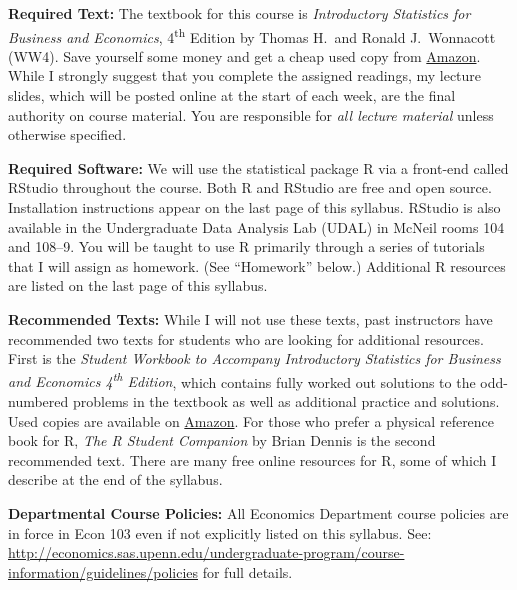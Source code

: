 \documentclass[11pt, letterpaper]{article}
\begin{document}
\medskip

\noindent \textbf{Required Text:} 
The textbook for this course is \emph{Introductory Statistics for Business and Economics}, 4\textsuperscript{th} Edition by Thomas H.\ and Ronald J.\ Wonnacott (WW4). 
Save yourself some money and get a cheap used copy from \href{http://tinyurl.com/ECON103-2013A}{Amazon}.
While I strongly suggest that you complete the assigned readings, my lecture slides, which will be posted online at the start of each week, are the final authority on course material. 
You are responsible for \emph{all lecture material} unless otherwise specified.

\medskip

\noindent \textbf{Required Software:} 
We will use the statistical package R via a front-end called RStudio throughout the course. 
Both R and RStudio are free and open source. Installation instructions appear on the last page of this syllabus.
RStudio is also available in the Undergraduate Data Analysis Lab (UDAL) in McNeil rooms 104 and 108--9. 
You will be taught to use R primarily through a series of tutorials that I will assign as homework. (See ``Homework'' below.)  
Additional R resources are listed on the last page of this syllabus.

\medskip

\noindent \textbf{Recommended Texts:} 
While I will not use these texts, past instructors have recommended two texts for students who are looking for additional resources. 
First is the \emph{Student Workbook to Accompany Introductory Statistics for Business and Economics 4\textsuperscript{th} Edition}, which contains fully worked out solutions to the odd-numbered problems in the textbook as well as additional practice and solutions. 
Used copies are available on \href{http://www.amazon.com/gp/offer-listing/0471508993/sr=/qid=/ref=olp_page_2?ie=UTF8&colid=&coliid=&condition=all&me=&qid=&shipPromoFilter=0&sort=sip&sr=&startIndex=10}{Amazon}. 
For those who prefer a physical reference book for R, \emph{The R Student Companion} by Brian Dennis is the second recommended text. 
There are many free online resources for R, some of which I describe at the end of the syllabus.

\newpage

\noindent \textbf{Departmental Course Policies: } 
All Economics Department course policies are in force in Econ 103 even if not explicitly listed on this syllabus. 
See: \url{http://economics.sas.upenn.edu/undergraduate-program/course-information/guidelines/policies} for full details. 
\end{document}
